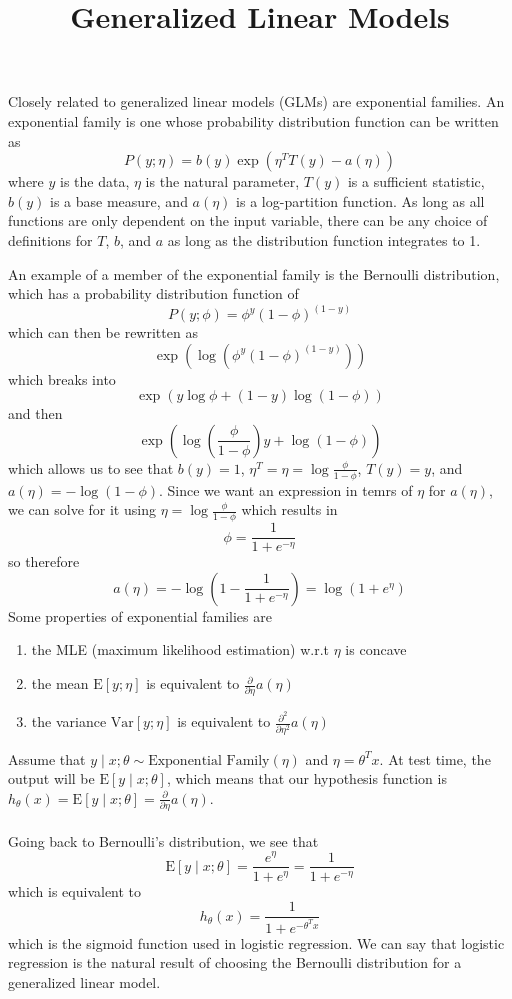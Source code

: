 \documentclass[11pt]{article}
\title{Generalized Linear Models}
\author{}
\date{}
\begin{document}
\maketitle
\vspace{-1.2em}
Closely related to generalized linear models (GLMs) are exponential families. An exponential family is one whose probability distribution function can be written as
$$P(y;\eta) = b(y) \exp{\left(\eta^T T(y) - a(\eta)\right)}$$
where $y$ is the data, $\eta$ is the natural parameter, $T(y)$ is a sufficient statistic, $b(y)$ is a base measure, and $a(\eta)$ is a log-partition function. As long as all functions are only dependent on the input variable, there can be any choice of definitions for $T$, $b$, and $a$ as long as the distribution function integrates to 1.

An example of a member of the exponential family is the Bernoulli distribution, which has a probability distribution function of
$$P(y;\phi) = \phi^y(1 - \phi)^{(1-y)}$$ which can then be rewritten as $$\exp{\left(\log{\left(\phi^y(1 - \phi)^{(1-y)}\right)}\right)}$$ which breaks into $$\exp{\left(y\log{\phi} + (1-y)\log{(1-\phi)}\right)}$$ and then $$\exp{\left(\log{\left(\frac{\phi}{1-\phi}\right)y+\log{(1-\phi)}}\right)}$$
which allows us to see that $b(y) = 1$, $\eta^T = \eta = \log{\frac{\phi}{1-\phi}}$, $T(y) = y$, and $a(\eta) = -\log{(1-\phi)}$. Since we want an expression in temrs of $\eta$ for $a(\eta)$, we can solve for it using $\eta = \log{\frac{\phi}{1-\phi}}$ which results in
$$\phi = \frac{1}{1+e^{-\eta}}$$
so therefore
$$a(\eta) = -\log{\left(1-\frac{1}{1+e^{-\eta}}\right)} = \log{\left(1+e^\eta\right)}$$
Some properties of exponential families are
\begin{enumerate}
    \item the MLE (maximum likelihood estimation) w.r.t $\eta$ is concave
    \item the mean $\text{E}[y;\eta]$ is equivalent to $\frac{\partial}{\partial\eta}a(\eta)$
    \item the variance $\text{Var}[y;\eta]$ is equivalent to $\frac{\partial^2}{\partial\eta^2}a(\eta)$
\end{enumerate}
\clearpage
Assume that $y \mid x ; \theta \sim \text{Exponential Family}(\eta)$ and $\eta = \theta^T x$. At test time, the output will be $\text{E}\left[y \mid x;\theta\right]$, which means that our hypothesis function is $h_\theta(x) = \text{E}\left[y \mid x;\theta\right] = \frac{\partial}{\partial \eta} a(\eta)$. \\
\vspace{0em} \\
Going back to Bernoulli's distribution, we see that $$\text{E}\left[y \mid x;\theta\right] = \frac{e^\eta}{1+e^\eta} = \frac{1}{1+e^{-\eta}}$$
which is equivalent to
$$h_\theta(x) = \frac{1}{1+e^{-\theta^T x}}$$
which is the sigmoid function used in logistic regression. We can say that logistic regression is the natural result of choosing the Bernoulli distribution for a generalized linear model.
\end{document}
